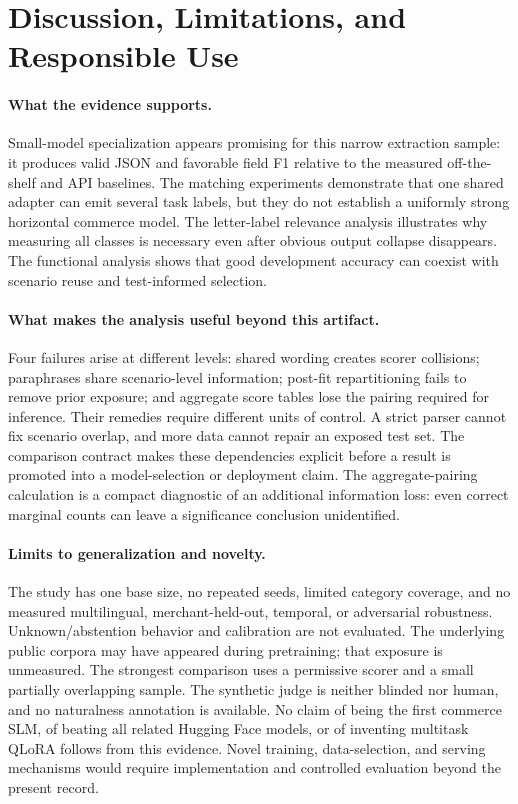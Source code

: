 \section{Discussion, Limitations, and Responsible Use}
\label{sec:discussion}
\paragraph{What the evidence supports.}
Small-model specialization appears promising for this narrow extraction sample: it produces valid JSON and favorable field F1 relative to the measured off-the-shelf and API baselines. The matching experiments demonstrate that one shared adapter can emit several task labels, but they do not establish a uniformly strong horizontal commerce model. The letter-label relevance analysis illustrates why measuring all classes is necessary even after obvious output collapse disappears. The functional analysis shows that good development accuracy can coexist with scenario reuse and test-informed selection.

\paragraph{What makes the analysis useful beyond this artifact.}
Four failures arise at different levels: shared wording creates scorer collisions; paraphrases share scenario-level information; post-fit repartitioning fails to remove prior exposure; and aggregate score tables lose the pairing required for inference. Their remedies require different units of control. A strict parser cannot fix scenario overlap, and more data cannot repair an exposed test set. The comparison contract makes these dependencies explicit before a result is promoted into a model-selection or deployment claim. The aggregate-pairing calculation is a compact diagnostic of an additional information loss: even correct marginal counts can leave a significance conclusion unidentified.

\paragraph{Limits to generalization and novelty.}
The study has one base size, no repeated seeds, limited category coverage, and no measured multilingual, merchant-held-out, temporal, or adversarial robustness. Unknown/abstention behavior and calibration are not evaluated. The underlying public corpora may have appeared during pretraining; that exposure is unmeasured. The strongest comparison uses a permissive scorer and a small partially overlapping sample. The synthetic judge is neither blinded nor human, and no naturalness annotation is available. No claim of being the first commerce SLM, of beating all related Hugging Face models, or of inventing multitask QLoRA follows from this evidence. Novel training, data-selection, and serving mechanisms would require implementation and controlled evaluation beyond the present record.

